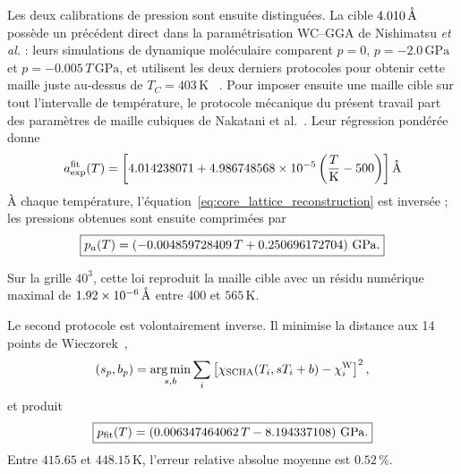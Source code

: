 Les deux calibrations de pression sont ensuite distinguées. La cible
$4.010\,\mathring{\rm A}$ possède un précédent direct dans la paramétrisation
WC--GGA de Nishimatsu \emph{et al.} : leurs simulations de dynamique
moléculaire comparent $p=0$, $p=-2.0\,\mathrm{GPa}$ et
$p=-0.005\,T\,\mathrm{GPa}$, et utilisent les deux derniers protocoles pour
obtenir cette maille juste au-dessus de $T_C=403\,\mathrm K$
~\cite{Nishimatsu2010}.
Pour imposer ensuite une maille cible sur tout l'intervalle de température, le
protocole mécanique du présent travail part des paramètres de maille cubiques
de Nakatani et al.~\cite{Nakatani2016}. Leur régression pondérée donne
\begin{equation}
a_{\rm exp}^{\rm fit}(T)=
\left[4.014238071+
4.986748568\times10^{-5}
\left(\frac{T}{\mathrm K}-500\right)\right]\mathring{\rm A}
\label{eq:core_lattice_fit}
\end{equation}
À chaque
température, l'équation~\eqref{eq:core_lattice_reconstruction} est inversée ; les
pressions obtenues sont ensuite comprimées par
\begin{equation}
\boxed{
p_a(T)=(-0.004859728409\,T+0.250696172704)\ {\rm GPa}.}
\label{eq:core_lattice_pressure}
\end{equation}

Sur la grille $40^3$, cette loi reproduit la maille cible avec un résidu
numérique maximal de $1.92\times10^{-6}\,\mathring{\rm A}$ entre 400 et
$565\,\mathrm K$.

Le second protocole est volontairement inverse. Il minimise la distance aux 14
points de Wieczorek~\cite{Wieczorek2006},
\begin{equation}
(s_p,b_p)=\mathop{\rm arg\,min}_{s,b}
\sum_i\left[
\chi_{\rm SCHA}(T_i,sT_i+b)-\chi_i^{\rm W}
\right]^2,
\label{eq:core_inverse_pressure_objective}
\end{equation}
et produit
\begin{equation}
\boxed{
p_{\rm fit}(T)=
(0.006347464062\,T-8.194337108)\ {\rm GPa}.}
\label{eq:core_inverse_pressure}
\end{equation}
Entre $415.65$ et $448.15\,\mathrm K$, l'erreur relative absolue moyenne est
$0.52\,\%$.

